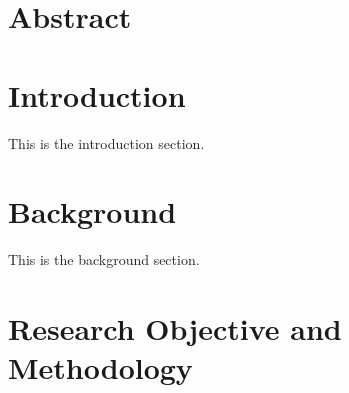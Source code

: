 \documentclass[a4paper,12pt]{article}
\title{\proposalTitle}
\author{\proposalAuthor}
\date{}
\begin{document}
\ifluatex
    
\else
    \thispagestyle{empty}
    
    \clearpage
\fi


\section*{Abstract}
\clearpage


\glsresetall

\ifluatex
    
\else
    
    \clearpage
\fi

    \tableofcontents
\clearpage

    \listoffigures
\clearpage



\section{Introduction}
\label{sec_intro}

This is the introduction section.

\clearpage

\section{Background}
\label{sec_background}

This is the background section.

\clearpage

\section{Research Objective and Methodology}
\end{document}
